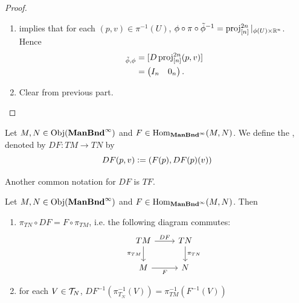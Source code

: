\documentclass{book}
\begin{document}
\begin{proof}
	\begin{enumerate}
		\item {} \rex{} implies that for each $(p,v) \in \pi^{-1}(U)$, $\phi \circ \pi \circ \tilde{\phi}^{-1} = \operatorname{\text{proj}}^{2n}_{[n]}|_{\phi(U) \times \mathbb{R}^n}$. Hence 
		\begin{align*}
			[D \pi (p,v)]_{\tl{\phi}, \phi}
			& = [D \prj^{2n}_{[n]}(p,v)] \\
			& = 
			\begin{pmatrix}
				I_n & 0_n
			\end{pmatrix}.
		\end{align*}
		\item Clear from previous part.
	\end{enumerate}
\end{proof}

\begin{defn}
	Let $M,N \in \operatorname{Obj}(\operatorname*{\text{\textbf{ManBnd}}^{\infty}})$ and $F \in \operatorname{Hom}_{\operatorname*{\text{\textbf{ManBnd}}^{\infty}}}(M, N)$. We define the , denoted by $DF: TM \rightarrow TN$ by 
	$$DF(p, v) \vcentcolon= (F(p), DF(p)(v))$$
\end{defn}

\begin{note}
	Another common notation for $DF$ is $TF$.
\end{note}

\begin{ex}
	Let $M,N \in \operatorname{Obj}(\operatorname*{\text{\textbf{ManBnd}}^{\infty}})$ and $F \in \operatorname{Hom}_{\operatorname*{\text{\textbf{ManBnd}}^{\infty}}}(M, N)$. Then 
	\begin{enumerate}
		\item $\pi_{TN} \circ DF = F \circ \pi_{TM}$, i.e. the following diagram commutes: 
		\[ 
		\begin{tikzcd}
			TM \arrow[r, "DF"] \arrow[d, "\pi_{TM}"'] & TN \arrow[d, "\pi_{TN}"]  \\
			M \arrow[r, "F"']                   & N
		\end{tikzcd}
		\]
		\item for each $V \in \mathcal{T}_N$, $DF^{-1}(\pi_{T_N}^{-1}(V)) = \pi_{TM}^{-1}(F^{-1}(V))$
	\end{enumerate}
\end{ex}
\end{document}
